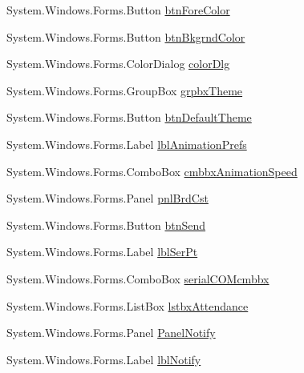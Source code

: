 \begin{DoxyCompactItemize}
\item 
\-System.\-Windows.\-Forms.\-Button \hyperlink{class_sr_p___classroom_inq_1_1frm_classrrom_inq_af3a459dee89d074c46f08528279e61e0}{btn\-Fore\-Color}
\item 
\-System.\-Windows.\-Forms.\-Button \hyperlink{class_sr_p___classroom_inq_1_1frm_classrrom_inq_a658aa508b7219ac91df61ae4e5b61e90}{btn\-Bkgrnd\-Color}
\item 
\-System.\-Windows.\-Forms.\-Color\-Dialog \hyperlink{class_sr_p___classroom_inq_1_1frm_classrrom_inq_afb408ee0fe102fbf3df36e551ec24d4c}{color\-Dlg}
\item 
\-System.\-Windows.\-Forms.\-Group\-Box \hyperlink{class_sr_p___classroom_inq_1_1frm_classrrom_inq_a8973e652358c775fec622ec378a52bf9}{grpbx\-Theme}
\item 
\-System.\-Windows.\-Forms.\-Button \hyperlink{class_sr_p___classroom_inq_1_1frm_classrrom_inq_a17fc9570ddfb13b5334d6f36eb6e7800}{btn\-Default\-Theme}
\item 
\-System.\-Windows.\-Forms.\-Label \hyperlink{class_sr_p___classroom_inq_1_1frm_classrrom_inq_a3e47dc47a77617c03e8c0347cdc0579b}{lbl\-Animation\-Prefs}
\item 
\-System.\-Windows.\-Forms.\-Combo\-Box \hyperlink{class_sr_p___classroom_inq_1_1frm_classrrom_inq_a23b040624768af2dd1a9417f5ba031d3}{cmbbx\-Animation\-Speed}
\item 
\-System.\-Windows.\-Forms.\-Panel \hyperlink{class_sr_p___classroom_inq_1_1frm_classrrom_inq_ac9c46f730b0cfb6a131875ede890b86d}{pnl\-Brd\-Cst}
\item 
\-System.\-Windows.\-Forms.\-Button \hyperlink{class_sr_p___classroom_inq_1_1frm_classrrom_inq_a5a1b78305ac1e8f7eb40a5d135fa3525}{btn\-Send}
\item 
\-System.\-Windows.\-Forms.\-Label \hyperlink{class_sr_p___classroom_inq_1_1frm_classrrom_inq_a26d1411dd06aa1ea7880dabb99777821}{lbl\-Ser\-Pt}
\item 
\-System.\-Windows.\-Forms.\-Combo\-Box \hyperlink{class_sr_p___classroom_inq_1_1frm_classrrom_inq_a78530d93c34ef9033ba7bd57c265782a}{serial\-C\-O\-Mcmbbx}
\item 
\-System.\-Windows.\-Forms.\-List\-Box \hyperlink{class_sr_p___classroom_inq_1_1frm_classrrom_inq_ac10f995b70bc21201309a93e18466bcd}{lstbx\-Attendance}
\item 
\-System.\-Windows.\-Forms.\-Panel \hyperlink{class_sr_p___classroom_inq_1_1frm_classrrom_inq_a67eefeb9b6da8583b3ed3d95a3b411d0}{\-Panel\-Notify}
\item 
\-System.\-Windows.\-Forms.\-Label \hyperlink{class_sr_p___classroom_inq_1_1frm_classrrom_inq_ae411ca1f1461cf7e863fcaba8789c493}{lbl\-Notify}

\end{DoxyCompactItemize}

